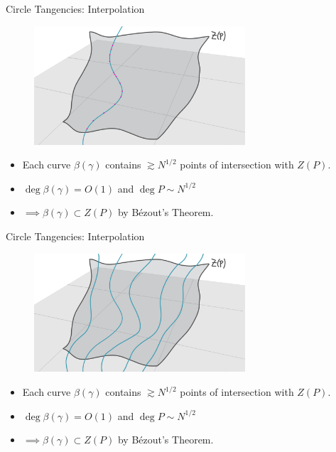 \documentclass{beamer}
\newcommand{\nfr}[1]{\begin{frame} #1
\end{frame}}
\begin{document}
\nfr{{Circle Tangencies: Interpolation}
\begin{figure}[h]
    \centering
    \includegraphics[width=0.7\textwidth]{images/lots_of_dots_f.png}
\end{figure}
\begin{itemize}
    \item Each curve $\beta(\gamma)$ contains $\gtrsim N^{1/2}$ points of intersection with $Z(P)$. \pause
    \item $\deg \beta(\gamma) = O (1)$ and $\deg P \sim N^{1/2}$ \pause
    \item $\implies \beta(\gamma) \subset Z(P)$ by Bézout's Theorem.
\end{itemize}
}

\nfr{{Circle Tangencies: Interpolation}
\begin{figure}[h]
    \centering
    \includegraphics[width=0.7\textwidth]{images/lots_of_dots_g.png}
\end{figure}
\begin{itemize}
    \item Each curve $\beta(\gamma)$ contains $\gtrsim N^{1/2}$ points of intersection with $Z(P)$.
    \item $\deg \beta(\gamma) = O (1)$ and $\deg P \sim N^{1/2}$
    \item $\implies \beta(\gamma) \subset Z(P)$ by Bézout's Theorem.
\end{itemize}
}
\end{document}
